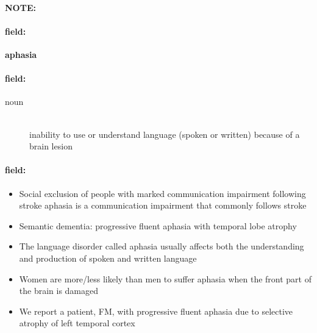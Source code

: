 \documentclass[12pt]{article}
\newenvironment{note}{\paragraph{NOTE:}}{}
\newenvironment{field}{\paragraph{field:}}{}
\begin{document}
\begin{note}
\begin{field}
\textbf{\large aphasia}
\end{field}


\begin{field}
\begin{description}
\item[noun] \hfill \\ 
inability to use or understand language (spoken or written) because of a brain lesion

\end{description}
\end{field}

\begin{field}
\begin{itemize}
\item Social exclusion of people with marked communication impairment following stroke aphasia is a communication impairment that commonly follows stroke
\item Semantic dementia: progressive fluent aphasia with temporal lobe atrophy
\item The language disorder called aphasia usually affects both the understanding and production of spoken and written language
\item Women are more/less likely than men to suffer aphasia when the front part of the brain is damaged
\item We report a patient, FM, with progressive fluent aphasia due to selective atrophy of left temporal cortex
\end{itemize}
\end{field}
\end{note}
\end{document}
